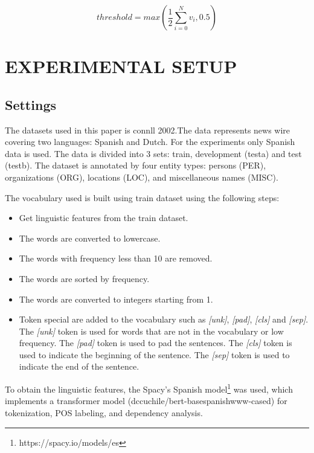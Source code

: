 \documentclass{IEEEtran}
\begin{document}

\begin{equation}
  \label{threshold_eq}
  threshold = max(\frac{1}{2} \sum_{i=0}^{N} v_i, 0.5)
\end{equation}


\section{EXPERIMENTAL SETUP}

\subsection{Settings}

The datasets used in this paper is connll 2002\cite{tjong-kim-sang-2002-introduction}.The data represents news wire covering two languages: Spanish and Dutch. For the experiments only Spanish data is used. The data is divided into 3 sets: train, development (testa) and test (testb). The dataset is annotated by four entity types: persons (PER), organizations (ORG), locations (LOC), and miscellaneous names (MISC).

The vocabulary used is built using train dataset using the following steps:
\begin{itemize}
  \item Get linguistic features from the train dataset.
  \item The words are converted to lowercase.
  \item The words with frequency less than 10 are removed.
  \item The words are sorted by frequency.
  \item The words are converted to integers starting from 1.
  \item Token special are added to the vocabulary such as \textit{[unk]},  \textit{[pad]}, \textit{[cls]} and \textit{[sep]}. The \textit{[unk]} token is used for words that are not in the vocabulary or low frequency. The \textit{[pad]} token is used to pad the sentences. The \textit{[cls]} token is used to indicate the beginning of the sentence. The \textit{[sep]} token is used to indicate the end of the sentence.
\end{itemize}

To obtain the linguistic features, the Spacy's Spanish model\footnote{https://spacy.io/models/es} was used, which implements a transformer model (dccuchile/bert\--base\-spanish\-www\--cased) for tokenization, POS labeling, and dependency analysis.
\end{document}

